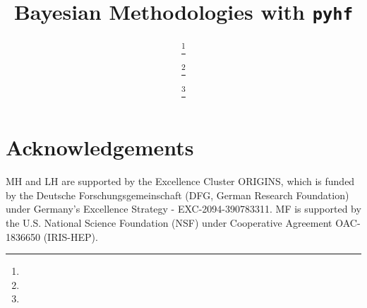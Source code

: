 \documentclass{latex/webofc}
\begin{document}
%
\title{Bayesian Methodologies with \texttt{pyhf}}

\author{ \fnsep\thanks{} \and
  \fnsep\thanks{} \and
  \fnsep\thanks{}
}


\abstract{%
 
}
%
\maketitle
%







\section{Acknowledgements}\label{sec:acknowledgements}

MH and LH are supported by the Excellence Cluster ORIGINS, which is funded by the Deutsche Forschungsgemeinschaft (DFG, German Research Foundation) under Germany’s Excellence Strategy - EXC-2094-390783311.
MF is supported by the U.S. National Science Foundation (NSF) under Cooperative Agreement OAC-1836650 (IRIS-HEP).


\end{document}
